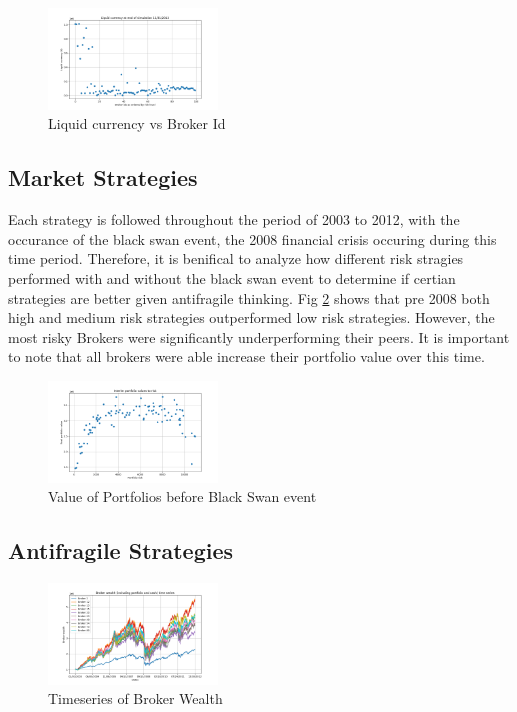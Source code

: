 \documentclass[letterpaper, 10 pt, proceedings]{ieeetran}
\begin{document}
	\begin{figure}[h]
		\centering
		\includegraphics[width=0.4\textwidth]{liquidCurrency.png}
		\caption{Liquid currency vs Broker Id}
		\label{liquidvID}
	\end{figure}
	\FloatBarrier	

	\subsection{Market Strategies}\label{subsec:results_midpoint}
	Each strategy is followed throughout the period of 2003 to 2012, with the occurance of the black swan event, the 2008 financial crisis occuring during this time period. Therefore, it is benifical to analyze how different risk stragies performed with and without the black swan event to determine if certian strategies are better given antifragile thinking. Fig \ref{interimRV} shows that pre 2008 both high and medium risk strategies outperformed low risk strategies. However, the most risky Brokers were significantly underperforming their peers. It is important to note that all brokers were able increase their portfolio value over this time.

	\begin{figure}[h]
		\centering
		\includegraphics[width=0.4\textwidth]{interimRiskToValue.png}
		\caption{Value of Portfolios before Black Swan event}
		\label{interimRV}
	\end{figure}
	\FloatBarrier


	\subsection{Antifragile Strategies}\label{subsec:results_end}	
	
	\begin{figure}[h]
		\centering
		\includegraphics[width=0.4\textwidth]{timeSeriesJoint.png}
		\caption{Timeseries of Broker Wealth}
		\label{ts_03-12}
	\end{figure}
	\FloatBarrier
\end{document}
